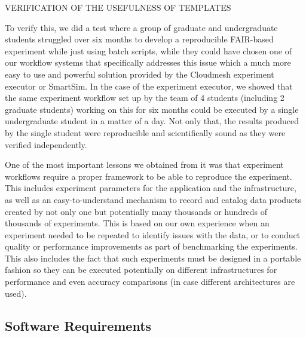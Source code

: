 
VERIFICATION OF THE USEFULNESS OF TEMPLATES

To verify this, we did a test where a group of graduate and undergraduate students struggled over six months to develop a reproducible FAIR-based experiment while just using batch scripts, while they could have chosen one of our workflow systems that specifically addresses this issue which a much more easy to use and powerful solution provided by the Cloudmesh experiment executor or SmartSim. In the case of the experiment executor, we showed that the same experiment workflow set up by the team of 4 students (including 2 graduate students) working on this for six months could be executed by a single undergraduate student in a matter of a day. Not only that, the results produced by the single student were reproducible and scientifically sound as they were verified independently.

One of the most important lessons we obtained from it was that experiment workflows require a proper framework to be able to reproduce the experiment. This includes experiment parameters for the application and the infrastructure, as well as an easy-to-understand mechanism to record and catalog data products created by not only one but potentially many thousands or hundreds of thousands of experiments. This is based on our own experience when an experiment needed to be repeated to identify issues with the data, or to conduct quality or performance improvements as part of benchmarking the experiments. This also includes the fact that such experiments must be designed in a portable fashion so they can be executed potentially on different infrastructures for performance and even accuracy comparisons (in case different architectures are used).



\subsection{Software Requirements}
\label{sec:sw-requirements}




